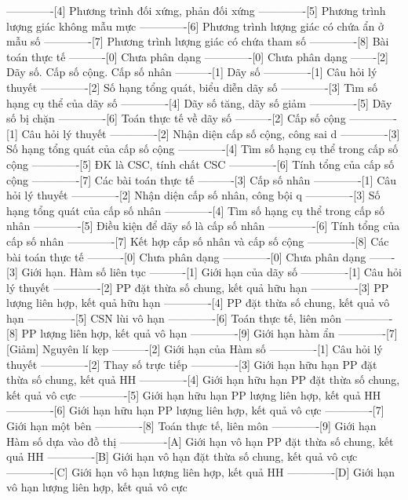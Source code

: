 -------------[4] Phương trình đối xứng, phản đối xứng
-------------[5] Phương trình lượng giác không mẫu mực
-------------[6] Phương trình lượng giác có chứa ẩn ở mẫu số
-------------[7] Phương trình lượng giác có chứa tham số
-------------[8] Bài toán thực tế
----------[0] Chưa phân dạng
-------------[0] Chưa phân dạng
-------[2] Dãy số. Cấp số cộng. Cấp số nhân
----------[1] Dãy số
-------------[1] Câu hỏi lý thuyết
-------------[2] Số hạng tổng quát, biểu diễn dãy số
-------------[3] Tìm số hạng cụ thể của dãy số
-------------[4] Dãy số tăng, dãy số giảm
-------------[5] Dãy số bị chặn
-------------[6] Toán thực tế về dãy số
----------[2] Cấp số cộng
-------------[1] Câu hỏi lý thuyết
-------------[2] Nhận diện cấp số cộng, công sai d
-------------[3] Số hạng tổng quát của cấp số cộng
-------------[4] Tìm số hạng cụ thể trong cấp số cộng
-------------[5] ĐK là CSC, tính chất CSC
-------------[6] Tính tổng của cấp số cộng
-------------[7] Các bài toán thực tế
----------[3] Cấp số nhân
-------------[1] Câu hỏi lý thuyết
-------------[2] Nhận diện cấp số nhân, công bội q
-------------[3] Số hạng tổng quát của cấp số nhân
-------------[4] Tìm số hạng cụ thể trong cấp số nhân
-------------[5] Điều kiện để dãy số là cấp số nhân
-------------[6] Tính tổng của cấp số nhân
-------------[7] Kết hợp cấp số nhân và cấp số cộng
-------------[8] Các bài toán thực tế
----------[0] Chưa phân dạng
-------------[0] Chưa phân dạng
-------[3] Giới hạn. Hàm số liên tục
----------[1] Giới hạn của dãy số
-------------[1] Câu hỏi lý thuyết
-------------[2] PP đặt thừa số chung, kết quả hữu hạn
-------------[3] PP lượng liên hợp, kết quả hữu hạn
-------------[4] PP đặt thừa số chung, kết quả vô hạn
-------------[5] CSN lùi vô hạn 
-------------[6] Toán thực tế, liên môn
-------------[8] PP lượng liên hợp, kết quả vô hạn
-------------[9] Giới hạn hàm ẩn
-------------[7] [Giảm] Nguyên lí kẹp
----------[2] Giới hạn của Hàm số
-------------[1] Câu hỏi lý thuyết
-------------[2] Thay số trực tiếp
-------------[3] Giới hạn hữu hạn PP đặt thừa số chung, kết quả HH
-------------[4] Giới hạn hữu hạn PP đặt thừa số chung, kết quả vô cực
-------------[5] Giới hạn hữu hạn PP lượng liên hợp, kết quả HH
-------------[6] Giới hạn hữu hạn PP lượng liên hợp, kết quả vô cực
-------------[7] Giới hạn một bên
-------------[8] Toán thực tế, liên môn
-------------[9] Giới hạn Hàm số dựa vào đồ thị
-------------[A] Giới hạn vô hạn PP đặt thừa số chung, kết quả HH
-------------[B] Giới hạn vô hạn đặt thừa số chung, kết quả vô cực
-------------[C] Giới hạn vô hạn lượng liên hợp, kết quả HH
-------------[D] Giới hạn vô hạn lượng liên hợp, kết quả vô cực
